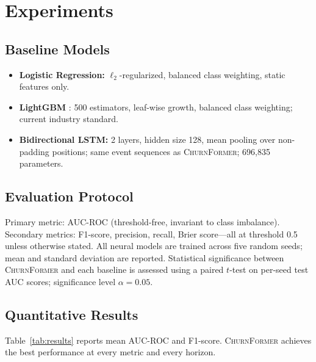 \documentclass[review, 12pt]{elsarticle}
\newcommand{\model}{\textsc{ChurnFormer}}
\begin{document}
\section{Experiments}
\label{sec:experiments}

\subsection{Baseline Models}

\begin{itemize}[leftmargin=2em]
  \item \textbf{Logistic Regression:} $\ell_2$-regularized, balanced class
    weighting, static features only.
  \item \textbf{LightGBM} \cite{ke2017}: 500 estimators, leaf-wise growth,
    balanced class weighting; current industry standard.
  \item \textbf{Bidirectional LSTM:} 2 layers, hidden size 128, mean pooling
    over non-padding positions; same event sequences as \model{};
    696{,}835 parameters.
\end{itemize}

\subsection{Evaluation Protocol}

Primary metric: AUC-ROC (threshold-free, invariant to class imbalance).
Secondary metrics: F1-score, precision, recall, Brier score---all at
threshold 0.5 unless otherwise stated.
All neural models are trained across five random seeds; mean and standard
deviation are reported.
Statistical significance between \model{} and each baseline is assessed
using a paired $t$-test on per-seed test AUC scores; significance level
$\alpha = 0.05$.

\subsection{Quantitative Results}

Table~\ref{tab:results} reports mean AUC-ROC and F1-score.
\model{} achieves the best performance at every metric and every horizon.
\end{document}
